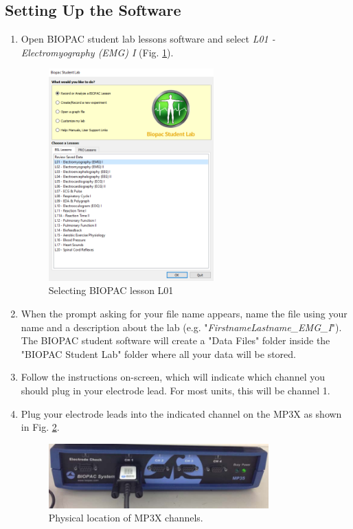 \documentclass{article}
\begin{document}
\subsection*{Setting Up the Software}
\begin{enumerate}
	\item Open BIOPAC student lab lessons software and select \textit{L01 - Electromyography (EMG) I} (Fig. \ref{lesson}).
		\begin{figure}[h]
	\includegraphics[width=0.6\textwidth]{../images/EMG_I_13.png}
		\centering
		\caption{Selecting BIOPAC lesson L01}
		\label{lesson}
		\end{figure}
		
	\item When the prompt asking for your file name appears, name the file using your name and a description about the lab (e.g. "\textit{FirstnameLastname\_EMG\_I}"). The BIOPAC student software will create a "Data Files" folder inside the "BIOPAC Student Lab" folder where all your data will be stored.
	\item Follow the instructions on-screen, which will indicate which channel you should plug in your electrode lead. For most units, this will be channel 1.	
	\item Plug your electrode leads into the indicated channel on the MP3X as shown in Fig. \ref{channel2}.
		\begin{figure}[h]
	\includegraphics[width=0.8\textwidth]{../images/EMG_I_6.jpg}
		\centering
		\caption{Physical location of MP3X channels.}
		\label{channel2}
		\end{figure}
	

\end{enumerate}
\end{document}
